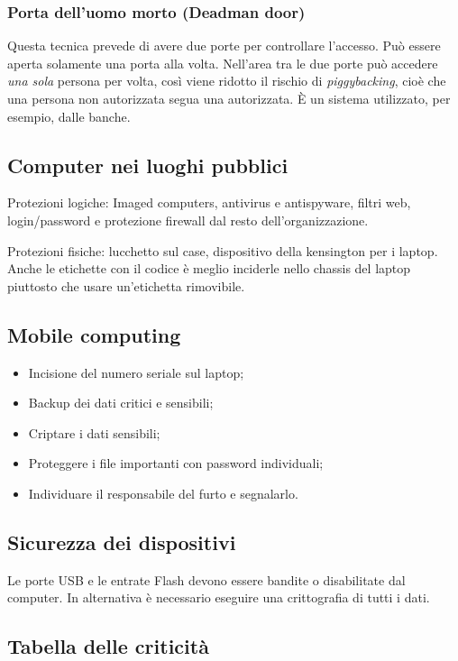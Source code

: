 \subsubsection{Porta dell'uomo morto (Deadman door)}
Questa tecnica prevede di avere due porte per controllare l'accesso.
Può essere aperta solamente una porta alla volta.
Nell'area tra le due porte può accedere \emph{una sola} persona per
volta, così viene ridotto il rischio di \textit{piggybacking}, 
cioè che una persona non autorizzata segua una autorizzata. 
È un sistema utilizzato, per esempio, dalle banche.


\subsection{Computer nei luoghi pubblici}

Protezioni logiche: Imaged computers, antivirus e antispyware, filtri web,
login/password e protezione firewall dal resto dell'organizzazione.

Protezioni fisiche: lucchetto sul case, dispositivo della kensington per i
laptop. Anche le etichette con il codice è meglio inciderle nello chassis del
laptop piuttosto che usare un'etichetta rimovibile.

\subsection{Mobile computing}

\begin{itemize}
\item Incisione del numero seriale sul laptop;
\item Backup dei dati critici e sensibili;
\item Criptare i dati sensibili;
\item Proteggere i file importanti con password individuali;
\item Individuare il responsabile del furto e segnalarlo.
\end{itemize}


\subsection{Sicurezza dei dispositivi}

Le porte USB e le entrate Flash devono essere bandite o disabilitate dal
computer. In alternativa è necessario eseguire una crittografia di tutti i dati.


\subsection{Tabella delle criticità}

